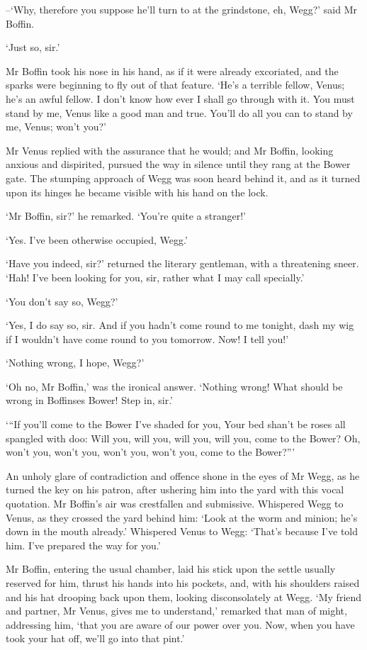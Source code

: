 --‘Why, therefore you suppose he’ll turn to at the grindstone, eh,
Wegg?’ said Mr Boffin.

‘Just so, sir.’

Mr Boffin took his nose in his hand, as if it were already excoriated,
and the sparks were beginning to fly out of that feature. ‘He’s a
terrible fellow, Venus; he’s an awful fellow. I don’t know how ever I
shall go through with it. You must stand by me, Venus like a good man
and true. You’ll do all you can to stand by me, Venus; won’t you?’

Mr Venus replied with the assurance that he would; and Mr Boffin,
looking anxious and dispirited, pursued the way in silence until they
rang at the Bower gate. The stumping approach of Wegg was soon heard
behind it, and as it turned upon its hinges he became visible with his
hand on the lock.

‘Mr Boffin, sir?’ he remarked. ‘You’re quite a stranger!’

‘Yes. I’ve been otherwise occupied, Wegg.’

‘Have you indeed, sir?’ returned the literary gentleman, with a
threatening sneer. ‘Hah! I’ve been looking for you, sir, rather what I
may call specially.’

‘You don’t say so, Wegg?’

‘Yes, I do say so, sir. And if you hadn’t come round to me tonight, dash
my wig if I wouldn’t have come round to you tomorrow. Now! I tell you!’

‘Nothing wrong, I hope, Wegg?’

‘Oh no, Mr Boffin,’ was the ironical answer. ‘Nothing wrong! What should
be wrong in Boffinses Bower! Step in, sir.’

     ‘“If you’ll come to the Bower I’ve shaded for you,
     Your bed shan’t be roses all spangled with doo:
     Will you, will you, will you, will you, come to the Bower?
     Oh, won’t you, won’t you, won’t you, won’t you, come to the
          Bower?”’

An unholy glare of contradiction and offence shone in the eyes of Mr
Wegg, as he turned the key on his patron, after ushering him into the
yard with this vocal quotation. Mr Boffin’s air was crestfallen and
submissive. Whispered Wegg to Venus, as they crossed the yard behind
him: ‘Look at the worm and minion; he’s down in the mouth already.’
Whispered Venus to Wegg: ‘That’s because I’ve told him. I’ve prepared
the way for you.’

Mr Boffin, entering the usual chamber, laid his stick upon the settle
usually reserved for him, thrust his hands into his pockets, and,
with his shoulders raised and his hat drooping back upon them, looking
disconsolately at Wegg. ‘My friend and partner, Mr Venus, gives me to
understand,’ remarked that man of might, addressing him, ‘that you are
aware of our power over you. Now, when you have took your hat off, we’ll
go into that pint.’


